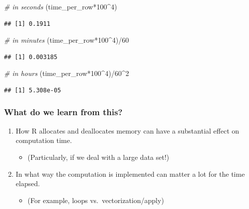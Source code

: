 \documentclass[
  12pt,
]{style/krantz}
\newenvironment{Shaded}{\begin{snugshade}}{\end{snugshade}}
\newcommand{\CommentTok}[1]{\textcolor[rgb]{0.56,0.35,0.01}{\textit{#1}}}
\newcommand{\DecValTok}[1]{\textcolor[rgb]{0.00,0.00,0.81}{#1}}
\newcommand{\NormalTok}[1]{#1}
\newcommand{\SpecialCharTok}[1]{\textcolor[rgb]{0.00,0.00,0.00}{#1}}
\providecommand{\tightlist}{%
  \setlength{\itemsep}{0pt}\setlength{\parskip}{0pt}}
\begin{document}
\begin{Shaded}
\begin{Highlighting}[]
\CommentTok{\# in seconds}
\NormalTok{(time\_per\_row}\SpecialCharTok{*}\DecValTok{100}\SpecialCharTok{\^{}}\DecValTok{4}\NormalTok{) }
\end{Highlighting}
\end{Shaded}

\begin{verbatim}
## [1] 0.1911
\end{verbatim}

\begin{Shaded}
\begin{Highlighting}[]
\CommentTok{\# in minutes}
\NormalTok{(time\_per\_row}\SpecialCharTok{*}\DecValTok{100}\SpecialCharTok{\^{}}\DecValTok{4}\NormalTok{)}\SpecialCharTok{/}\DecValTok{60} 
\end{Highlighting}
\end{Shaded}

\begin{verbatim}
## [1] 0.003185
\end{verbatim}

\begin{Shaded}
\begin{Highlighting}[]
\CommentTok{\# in hours}
\NormalTok{(time\_per\_row}\SpecialCharTok{*}\DecValTok{100}\SpecialCharTok{\^{}}\DecValTok{4}\NormalTok{)}\SpecialCharTok{/}\DecValTok{60}\SpecialCharTok{\^{}}\DecValTok{2} 
\end{Highlighting}
\end{Shaded}

\begin{verbatim}
## [1] 5.308e-05
\end{verbatim}

\hypertarget{what-do-we-learn-from-this}{%
\subsubsection{What do we learn from this?}\label{what-do-we-learn-from-this}}

\begin{enumerate}
\def\labelenumi{\arabic{enumi}.}
\tightlist
\item
  How R allocates and deallocates memory can have a substantial effect on computation time.

  \begin{itemize}
  \tightlist
  \item
    (Particularly, if we deal with a large data set!)
  \end{itemize}
\item
  In what way the computation is implemented can matter a lot for the time elapsed.

  \begin{itemize}
  \tightlist
  \item
    (For example, loops vs.~vectorization/apply)
  \end{itemize}
\end{enumerate}
\end{document}
